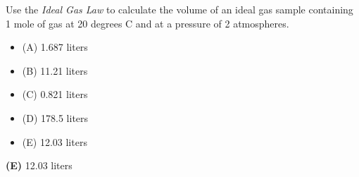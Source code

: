 

Use the {\it Ideal Gas Law} to calculate the volume of an ideal gas sample containing 1 mole of gas at 20 degrees C and at a pressure of 2 atmospheres. 

\begin{itemize}
\item{(A)} 1.687 liters
\vskip 5pt 
\item{(B)} 11.21 liters
\vskip 5pt 
\item{(C)} 0.821 liters
\vskip 5pt 
\item{(D)} 178.5 liters
\vskip 5pt 
\item{(E)} 12.03 liters
\end{itemize}







{\bf (E)} 12.03 liters
 










